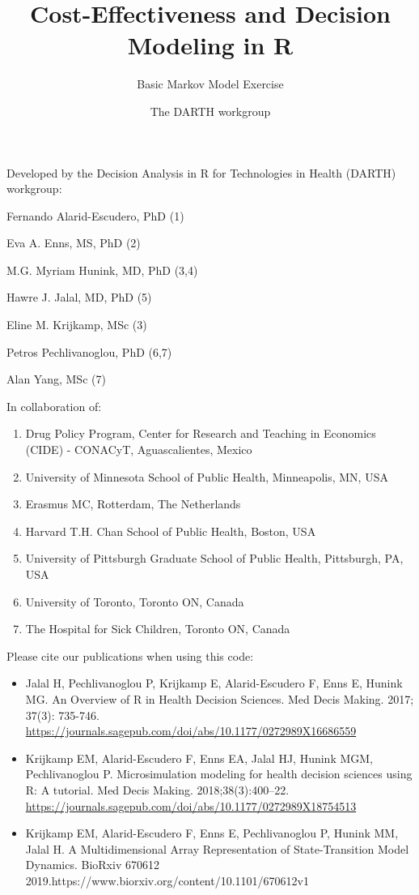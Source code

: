 \documentclass[
]{article}
\title{Cost-Effectiveness and Decision Modeling in R}
\subtitle{Basic Markov Model Exercise}
\author{The DARTH workgroup}
\date{}
\providecommand{\tightlist}{%
  \setlength{\itemsep}{0pt}\setlength{\parskip}{0pt}}
\begin{document}
\maketitle

Developed by the Decision Analysis in R for Technologies in Health
(DARTH) workgroup:

Fernando Alarid-Escudero, PhD (1)

Eva A. Enns, MS, PhD (2)

M.G. Myriam Hunink, MD, PhD (3,4)

Hawre J. Jalal, MD, PhD (5)

Eline M. Krijkamp, MSc (3)

Petros Pechlivanoglou, PhD (6,7)

Alan Yang, MSc (7)

In collaboration of:

\begin{enumerate}
\def\labelenumi{\arabic{enumi}.}
\tightlist
\item
  Drug Policy Program, Center for Research and Teaching in Economics
  (CIDE) - CONACyT, Aguascalientes, Mexico
\item
  University of Minnesota School of Public Health, Minneapolis, MN, USA
\item
  Erasmus MC, Rotterdam, The Netherlands
\item
  Harvard T.H. Chan School of Public Health, Boston, USA
\item
  University of Pittsburgh Graduate School of Public Health, Pittsburgh,
  PA, USA
\item
  University of Toronto, Toronto ON, Canada
\item
  The Hospital for Sick Children, Toronto ON, Canada
\end{enumerate}

Please cite our publications when using this code:

\begin{itemize}
\item
  Jalal H, Pechlivanoglou P, Krijkamp E, Alarid-Escudero F, Enns E,
  Hunink MG. An Overview of R in Health Decision Sciences. Med Decis
  Making. 2017; 37(3): 735-746.
  \url{https://journals.sagepub.com/doi/abs/10.1177/0272989X16686559}
\item
  Krijkamp EM, Alarid-Escudero F, Enns EA, Jalal HJ, Hunink MGM,
  Pechlivanoglou P. Microsimulation modeling for health decision
  sciences using R: A tutorial. Med Decis Making. 2018;38(3):400--22.
  \url{https://journals.sagepub.com/doi/abs/10.1177/0272989X18754513}
\item
  Krijkamp EM, Alarid-Escudero F, Enns E, Pechlivanoglou P, Hunink MM,
  Jalal H. A Multidimensional Array Representation of State-Transition
  Model Dynamics. BioRxiv 670612
  2019.https://www.biorxiv.org/content/10.1101/670612v1
\end{itemize}
\end{document}
